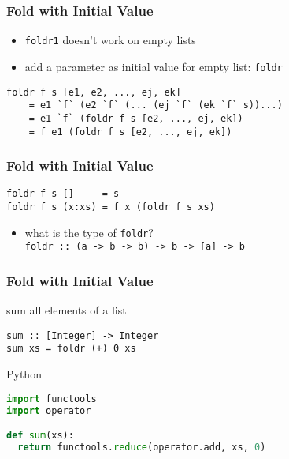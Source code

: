 \documentclass[dvipsnames]{beamer}
\theoremstyle{plain}
\begin{document}
\begin{frame}[fragile]
  \frametitle{Fold with Initial Value}

  \begin{itemize}
    \item \lstinline|foldr1| doesn't work on empty lists
    \item add a parameter as initial value for empty list:
      \lstinline|foldr|
  \end{itemize}

  \begin{block}{}
    \begin{lstlisting}
foldr f s [e1, e2, ..., ej, ek]
    = e1 `f` (e2 `f` (... (ej `f` (ek `f` s))...)
    = e1 `f` (foldr f s [e2, ..., ej, ek])
    = f e1 (foldr f s [e2, ..., ej, ek])
    \end{lstlisting}
  \end{block}
\end{frame}

\begin{frame}[fragile]
  \frametitle{Fold with Initial Value}

  \begin{exampleblock}{}
    \begin{lstlisting}[deletekeywords={foldr}]
foldr f s []     = s
foldr f s (x:xs) = f x (foldr f s xs)
    \end{lstlisting}

    \pause
    \medskip
    \begin{itemize}
      \item what is the type of \lstinline|foldr|?\\
        \lstinline|foldr :: (a -> b -> b) -> b -> [a] -> b|
    \end{itemize}
  \end{exampleblock}
\end{frame}

\begin{frame}[fragile]
  \frametitle{Fold with Initial Value}

  \begin{exampleblock}{sum all elements of a list}
    \begin{lstlisting}[deletekeywords={sum}]
sum :: [Integer] -> Integer
sum xs = foldr (+) 0 xs
    \end{lstlisting}
  \end{exampleblock}

  \bigskip
  \begin{exampleblock}{Python}
    \begin{lstlisting}[language=Python, deletekeywords={reduce, sum}]
import functools
import operator

def sum(xs):
  return functools.reduce(operator.add, xs, 0)
    \end{lstlisting}
  \end{exampleblock}
\end{frame}
\end{document}
